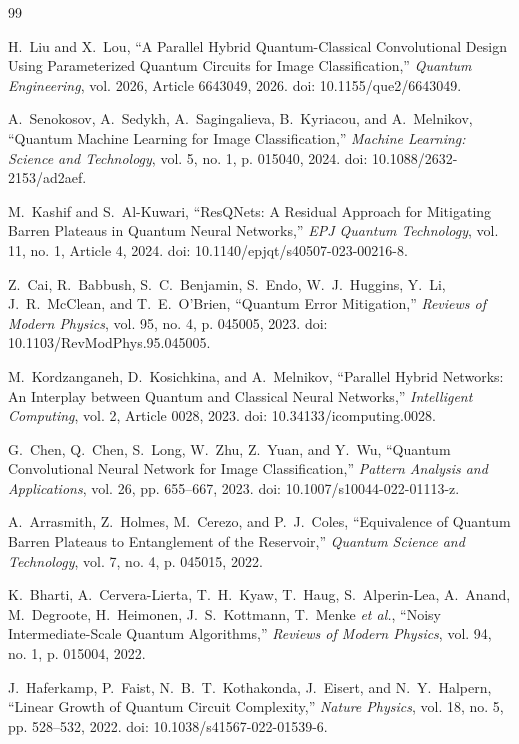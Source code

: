 \documentclass[journal]{IEEEtran}
\begin{document}
\begin{thebibliography}{99}

H.~Liu and X.~Lou,
``A Parallel Hybrid Quantum-Classical Convolutional Design Using Parameterized Quantum Circuits for Image Classification,''
\emph{Quantum Engineering}, vol. 2026, Article 6643049, 2026.
doi: 10.1155/que2/6643049.

A.~Senokosov, A.~Sedykh, A.~Sagingalieva, B.~Kyriacou, and A.~Melnikov,
``Quantum Machine Learning for Image Classification,''
\emph{Machine Learning: Science and Technology}, vol. 5, no. 1,
p. 015040, 2024.
doi: 10.1088/2632-2153/ad2aef.

M.~Kashif and S.~Al-Kuwari,
``ResQNets: A Residual Approach for Mitigating Barren Plateaus in Quantum Neural Networks,''
\emph{EPJ Quantum Technology}, vol. 11, no. 1, Article 4, 2024.
doi: 10.1140/epjqt/s40507-023-00216-8.

Z.~Cai, R.~Babbush, S.~C.~Benjamin, S.~Endo, W.~J.~Huggins,
Y.~Li, J.~R.~McClean, and T.~E.~O'Brien,
``Quantum Error Mitigation,''
\emph{Reviews of Modern Physics}, vol. 95, no. 4, p. 045005, 2023.
doi: 10.1103/RevModPhys.95.045005.

M.~Kordzanganeh, D.~Kosichkina, and A.~Melnikov,
``Parallel Hybrid Networks: An Interplay between Quantum and Classical Neural Networks,''
\emph{Intelligent Computing}, vol. 2, Article 0028, 2023.
doi: 10.34133/icomputing.0028.

G.~Chen, Q.~Chen, S.~Long, W.~Zhu, Z.~Yuan, and Y.~Wu,
``Quantum Convolutional Neural Network for Image Classification,''
\emph{Pattern Analysis and Applications}, vol. 26,
pp. 655--667, 2023.
doi: 10.1007/s10044-022-01113-z.

A.~Arrasmith, Z.~Holmes, M.~Cerezo, and P.~J.~Coles,
``Equivalence of Quantum Barren Plateaus to Entanglement of the Reservoir,''
\emph{Quantum Science and Technology}, vol. 7, no. 4,
p. 045015, 2022.

K.~Bharti, A.~Cervera-Lierta, T.~H.~Kyaw, T.~Haug, S.~Alperin-Lea,
A.~Anand, M.~Degroote, H.~Heimonen, J.~S.~Kottmann, T.~Menke
\emph{et al.},
``Noisy Intermediate-Scale Quantum Algorithms,''
\emph{Reviews of Modern Physics}, vol. 94, no. 1, p. 015004, 2022.

J.~Haferkamp, P.~Faist, N.~B.~T.~Kothakonda, J.~Eisert, and
N.~Y.~Halpern,
``Linear Growth of Quantum Circuit Complexity,''
\emph{Nature Physics}, vol. 18, no. 5,
pp. 528--532, 2022.
doi: 10.1038/s41567-022-01539-6.


\end{thebibliography}
\end{document}

